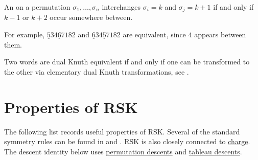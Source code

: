 An 
\label{elementaryDualKnuthTransformation} on a permutation
$\sigma_1,\dotsc,\sigma_n$
interchanges $\sigma_i =k$ and $\sigma_j =k+1$
if and only if $k-1$ or $k+2$ occur somewhere between.

For example, $\underline{5}34\underline{6}7182$ and $\underline{6}34\underline{5}7182$
are equivalent, since $4$ appears between them.

Two words are dual Knuth equivalent if and only if one can be transformed
to the other via elementary dual Knuth transformations, see
\cite[p.~200]{Fulton1997}.



\section[rskProperties]{Properties of RSK}

The following list records useful properties of RSK.
Several of the standard symmetry rules can be found in
\cite[App.~A.4.3]{Fulton1997} and \cite[A.1.2.11]{StanleyEC2}.
RSK is also closely connected to \hyperref[chargeProperties]{charge}.
The descent identity below uses \hyperref[descentSet]{permutation descents}
and \hyperref[tableauDescentSet]{tableau descents}.

